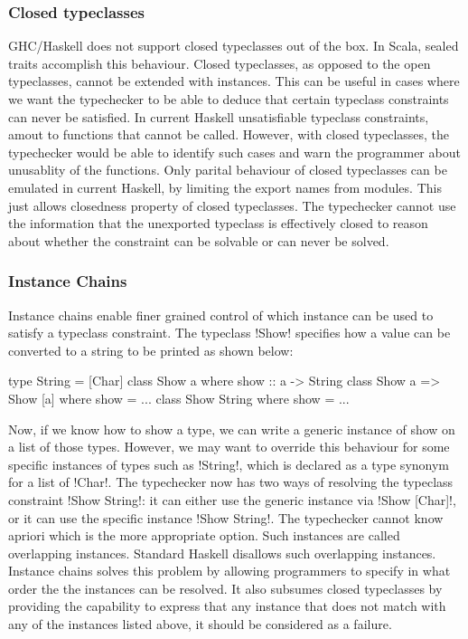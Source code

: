 \documentclass[screen,nonacm]{acmart}
\begin{document}
\subsubsection{Closed typeclasses}
GHC/Haskell does not support closed typeclasses out of the box. In Scala, sealed traits accomplish this behaviour. Closed typeclasses, as opposed to the open typeclasses, cannot be extended with instances. This can be useful in cases where we want the typechecker to be able to deduce that certain typeclass constraints can never be satisfied. In current Haskell unsatisfiable typeclass constraints, amout to functions that cannot be called. However, with closed typeclasses, the typechecker would be able to identify such cases and warn the programmer about unusablity of the functions. Only parital behaviour of closed typeclasses can be emulated in current Haskell, by limiting the export names from modules. This just allows closedness property of closed typeclasses. The typechecker cannot use the information that the unexported typeclass is effectively closed to reason about whether the constraint can be solvable or can never be solved.

\subsubsection{Instance Chains}
Instance chains\cite{morris_instance_2010} enable finer grained control of which instance can be used to satisfy a typeclass constraint. The typeclass !Show! specifies how a value can be converted to a string to be printed as shown below:

\begin{CenteredBox}
\begin{code}
type String = [Char]
class Show a where show :: a -> String
class Show a => Show [a] where show = ...
class Show String where show = ...
\end{code}
\end{CenteredBox}
Now, if we know how to show a type, we can write a generic instance of show on a list of those types. However, we may want to override this behaviour for some specific instances of types such as !String!, which is declared as a type synonym for a list of !Char!. The typechecker now has two ways of resolving the typeclass constraint !Show String!: it can either use the generic instance via !Show [Char]!, or it can use the specific instance !Show String!. The typechecker cannot know apriori which is the more appropriate option. Such instances are called overlapping instances. Standard Haskell disallows such overlapping instances. Instance chains solves this problem by allowing programmers to specify in what order the the instances can be resolved. It also subsumes closed typeclasses by providing the capability to express that any instance that does not match with any of the instances listed above, it should be considered as a failure.
\end{document}

